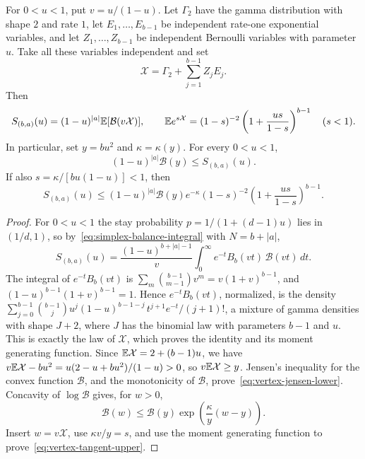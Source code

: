 \begin{lemma}
\label{lem:vertex-randomization}
For $0<u<1$, put $v=u/(1-u)$. Let $\Gamma_2$ have the gamma distribution
with shape $2$ and rate $1$, let $E_1,\ldots,E_{b-1}$ be independent
rate-one exponential variables, and let $Z_1,\ldots,Z_{b-1}$ be
independent Bernoulli variables with parameter $u$. Take all these
variables independent and set
\[
 \mathcal X=\Gamma_2+\sum_{j=1}^{b-1}Z_jE_j.
\]
Then
\begin{equation}\label{eq:vertex-randomization}
 S_{(b,a)}(u)=(1-u)^{|a|}\mathbb{E}[\mathcal B(v\mathcal X)],\qquad
 \mathbb{E} e^{s\mathcal X}=(1-s)^{-2}
 \left(1+\frac{us}{1-s}\right)^{b-1}\quad(s<1).
\end{equation}
In particular, set $y=bu^2$ and $\kappa=\kappa(y)$. For every $0<u<1$,
\begin{equation}\label{eq:vertex-jensen-lower}
 (1-u)^{|a|} \mathcal B(y)\le S_{(b,a)}(u).
\end{equation}
If also $s=\kappa/[bu(1-u)]<1$, then
\begin{equation}\label{eq:vertex-tangent-upper}
 S_{(b,a)}(u)\le (1-u)^{|a|} \mathcal B(y)e^{-\kappa}(1-s)^{-2}
 \left(1+\frac{us}{1-s}\right)^{b-1}.
\end{equation}
\end{lemma}

\begin{proof}
For $0<u<1$ the stay probability $p=1/(1+(d-1)u)$ lies in $(1/d,1)$, so
by~\eqref{eq:simplex-balance-integral} with $N=b+|a|$,
\[
 S_{(b,a)}(u)=\frac{(1-u)^{b+|a|-1}}v
 \int_0^\infty e^{-t}B_b(vt)\,\mathcal B(vt)\,dt.
\]
The integral of $e^{-t}B_b(vt)$ is $\sum_m\binom{b-1}{m-1}v^m=v(1+v)^{b-1}$, and
$(1-u)^{b-1}(1+v)^{b-1}=1$. Hence $e^{-t}B_b(vt)$, normalized, is the density
$\sum_{j=0}^{b-1}\binom{b-1}ju^j(1-u)^{b-1-j}\,t^{j+1}e^{-t}/(j+1)!$, a mixture of
gamma densities with shape $J+2$, where $J$ has the binomial law with parameters $b-1$ and $u$.
This is exactly the law of $\mathcal X$, which proves the identity and its
moment generating function. Since $\mathbb{E}\mathcal X=2+(b-1)u$, we have
$v\mathbb{E}\mathcal X-bu^2=u(2-u+bu^2)/(1-u)>0$, so $v\mathbb{E}\mathcal X\ge y$.
Jensen's inequality for the convex function $\mathcal B$, and the monotonicity of $\mathcal B$,
prove~\eqref{eq:vertex-jensen-lower}. Concavity of $\log\mathcal B$ gives, for $w>0$,
\[
 \mathcal B(w)\le \mathcal B(y)\exp\!\left(\frac{\kappa}{y}(w-y)\right).
\]
Insert $w=v\mathcal X$, use $\kappa v/y=s$, and use the moment
generating function to prove~\eqref{eq:vertex-tangent-upper}.
\end{proof}

